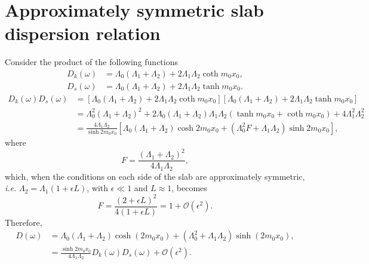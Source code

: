 \documentclass[12pt]{article}
\begin{document}
\section{Approximately symmetric slab dispersion relation}\label{app: approx sym DR}
Consider the product of the following functions
\begin{align}
D_k(\omega) &= \Lambda_0 (\Lambda_1 + \Lambda_2) + 2\Lambda_1\Lambda_2\coth{m_0x_0}, \\
D_s(\omega) &= \Lambda_0(\Lambda_1 + \Lambda_2) + 2\Lambda_1\Lambda_2\tanh{m_0x_0}.
\end{align}
\begin{align}
D_k(\omega) D_s(\omega) &= \left[ \Lambda_0 (\Lambda_1 + \Lambda_2) + 2\Lambda_1\Lambda_2\coth{m_0x_0} \right] \left[ \Lambda_0(\Lambda_1 + \Lambda_2) + 2\Lambda_1\Lambda_2\tanh{m_0x_0} \right] \\
&= \Lambda_0^2 (\Lambda_1 + \Lambda_2)^2 + 2\Lambda_0(\Lambda_1 + \Lambda_2)\Lambda_1\Lambda_2(\tanh{m_0x_0} + \coth{m_0x_0}) + 4\Lambda_1^2\Lambda_2^2 \\
&= \frac{4\Lambda_1\Lambda_2}{\sinh{2m_0x_0}} \left[ \Lambda_0(\Lambda_1 + \Lambda_2)\cosh{2m_0x_0} + (\Lambda_0^2F + \Lambda_1\Lambda_2)\sinh{2m_0x_0} \right],
\end{align}
where
\begin{equation}
F = \frac{(\Lambda_1 + \Lambda_2)^2}{4\Lambda_1\Lambda_2},
\end{equation}
which, when the conditions on each side of the slab are approximately symmetric, \textit{i.e.} $\Lambda_2 = \Lambda_1 (1 + \epsilon L)$, with $\epsilon \ll 1$ and $L \approx 1$, becomes
\begin{equation}
F = \frac{(2 + \epsilon L)^2}{4(1 + \epsilon L)} = 1 + \mathcal{O}(\epsilon^2).
\end{equation}
Therefore, 
\begin{align}
D(\omega) &= \Lambda_0(\Lambda_1 + \Lambda_2)\cosh(2m_0x_0) + (\Lambda_0^2 + \Lambda_1\Lambda_2)\sinh(2m_0x_0), \\
&= \frac{\sinh{2m_0x_0}}{4\Lambda_1\Lambda_2} D_k(\omega) D_s(\omega) + \mathcal{O}(\epsilon^2).
\end{align}
\end{document}
